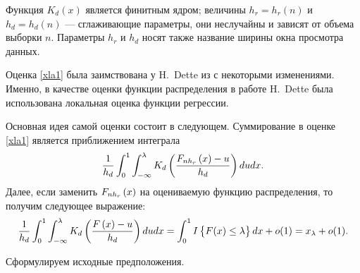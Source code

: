 \documentclass[a4paper,14pt,russian]{article}
\begin{document}
Функция $K_d(x)$ является финитным ядром; величины $h_r=h_r(n)$ и $h_d=h_d(n)$ --- сглаживающие параметры, они неслучайны и зависят от объема выборки $n$. Параметры $h_r$ и $h_d$ носят также название ширины окна просмотра данных.

\begin{remark}
  Оценка \eqref{xla1} была заимствована у H.~Dette из \cite{Dette} с некоторыми изменениями. Именно, в качестве оценки функции распределения в работе H.~Dette была использована локальная оценка функции регрессии.

  Основная идея самой оценки состоит в следующем.
  Суммирование в оценке \eqref{xla1} является приближением интеграла
  $$
  \frac{1}{ h_d} \int_{0}^{1}\int_{-\infty}^\lambda
K_d\left(\frac{F_{n h_r}\left(x\right)-u}{h_d}\right)dudx.
  $$
  Далее, если заменить $F_{n h_r}\left(x\right)$ на оцениваемую функцию распределения, то получим следующее выражение:
  $$
   \frac{1}{ h_d} \int_{0}^{1}\int_{-\infty}^\lambda
K_d\left(\frac{F\left(x\right)-u}{h_d}\right)dudx = \int_{0}^{1} I\left\{F(x)\leq \lambda\right\}dx + o(1) = x_\lambda + o(1).
  $$
\end{remark}

Сформулируем исходные предположения.
\end{document}
